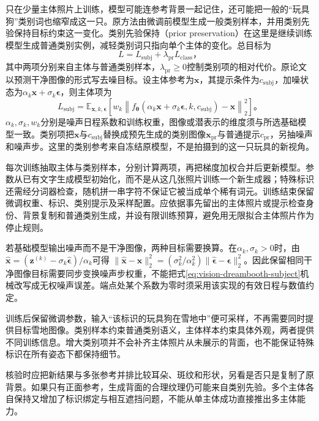 只在少量主体照片上训练，模型可能连参考背景一起记住，还可能把一般的“玩具狗”类别词也缩窄成这一只。原方法由微调前模型生成一般类别样本，并用类别先验保持目标约束这一变化。类别先验保持（prior preservation）在这里是继续训练模型生成普通类别实例，减轻类别词只指向单个主体的变化。总目标为
\begin{equation}
 L=L_{\mathrm{subj}}+\lambda_{\mathrm{pr}}L_{\mathrm{class}}\text{，}
 \label{eq:vision-dreambooth}
\end{equation}
其中两项分别来自主体与普通类别样本，$\lambda_{\mathrm{pr}}\geq0$控制类别项的相对代价。原论文以预测干净图像的形式写去噪目标。设主体参考为$\bm{x}$，其提示条件为$c_{\mathrm{subj}}$，加噪状态为$\alpha_k\bm{x}+\sigma_k\bm{\epsilon}$，则主体项为
\begin{equation}
 L_{\mathrm{subj}}=
 \mathbb{E}_{\bm{x},k,\bm{\epsilon}}
 \left[
 w_k\left\lVert
 f_{\bm{\theta}}(\alpha_k\bm{x}+\sigma_k\bm{\epsilon},
                  k,c_{\mathrm{subj}})-\bm{x}
 \right\rVert_2^2\right]\text{。}
 \label{eq:vision-dreambooth-subject}
\end{equation}
$\alpha_k,\sigma_k,w_k$分别是噪声日程系数和训练权重，图像或潜表示的维度须与所选基础模型一致。类别项把$\bm{x}$与$c_{\mathrm{subj}}$替换成预先生成的类别图像$\bm{x}_{\mathrm{pr}}$与普通提示$c_{\mathrm{pr}}$，另抽噪声和噪声步。这里的类别参考来自冻结原模型，不是拍摄到的这一只玩具的新视角。

每次训练抽取主体与类别样本，分别计算两项，再把梯度加权合并后更新模型。参数从已有文字生成模型初始化，而不是从这几张照片训练一个新生成器；特殊标识还需经分词器检查，随机拼一串字符不保证它被当成单个稀有词元。训练结束保留微调权重、标识、类别提示及采样配置。应依据事先留出的主体照片或提示检查身份、背景复制和普通类别生成，并设有限训练预算，避免用无限拟合主体照片作为停止规则。

若基础模型输出噪声而不是干净图像，两种目标需要换算。在$\alpha_k,\sigma_k>0$时，由$\hat{\bm{x}}=(\bm{z}^{(k)}-\sigma_k\hat{\bm{\epsilon}})/\alpha_k$可得
$\lVert\hat{\bm{x}}-\bm{x}\rVert_2^2=(\sigma_k^2/\alpha_k^2)\lVert\hat{\bm{\epsilon}}-\bm{\epsilon}\rVert_2^2$。因此保留相同干净图像目标需要同步变换噪声步权重，不能把式\eqref{eq:vision-dreambooth-subject}机械改写成无权噪声误差。端点处某个系数为零时须采用该实现的有效日程与数值约定。

训练后保留微调参数，输入“该标识的玩具狗在雪地中”便可采样，不再需要同时提供目标雪地图像。类别样本约束普通类别语义，主体样本约束具体外观，两者提供不同训练信息。增大类别项并不会补齐主体照片从未展示的背面，也不能保证特殊标识在所有姿态下都保持细节。

核验时应把新结果与多张参考并排比较耳朵、斑纹和形状，另看是否只是复制了原背景。如果只有正面参考，生成背面的合理纹理仍可能来自类别先验。多个主体各自保持又增加了标识绑定与相互遮挡问题，不能从单主体成功直接推出多主体能力。

